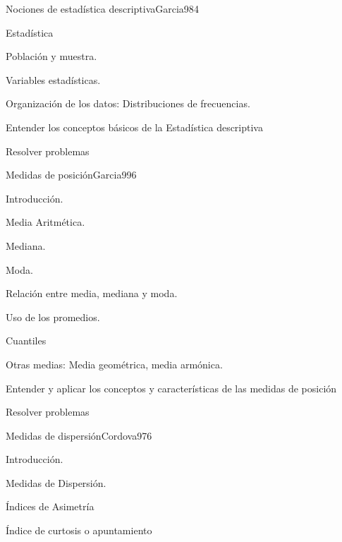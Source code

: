 \begin{sumilla}
\begin{outcomes}
\end{outcomes}

\begin{unit}{Nociones de estad\'istica descriptiva}{Garcia98}{4}
   \begin{topicos}
         \item  Estad\'istica
	 \item  Poblaci\'on y muestra.
	 \item  Variables estad\'isticas.
         \item  Organizaci\'on de los datos: Distribuciones de frecuencias.
   \end{topicos}

   \begin{objetivos}
         \item  Entender los conceptos b\'asicos de la Estad\'istica descriptiva
         \item  Resolver problemas
   \end{objetivos}
\end{unit}

\begin{unit}{Medidas de posici\'on}{Garcia99}{6}
   \begin{topicos}
	\item Introducci\'on.
	\item Media Aritm\'etica.
	\item Mediana.
	\item Moda.
	\item Relaci\'on entre media, mediana y moda.
	\item Uso de los promedios.
	\item Cuantiles
	\item Otras medias: Media geom\'etrica, media arm\'onica.
   \end{topicos}

   \begin{objetivos}
         \item  Entender y aplicar los conceptos y caracter\'isticas de las medidas de posici\'on
         \item  Resolver problemas
   \end{objetivos}
\end{unit}

\begin{unit}{Medidas de dispersi\'on}{Cordova97}{6}
   \begin{topicos}
         \item  Introducci\'on.
	 \item  Medidas de Dispersi\'on.
         \item  \'Indices de Asimetr\'ia
	 \item  \'Indice de curtosis o apuntamiento
   \end{topicos}


\end{unit}
\end{sumilla}
